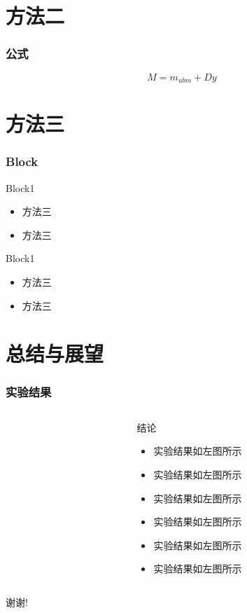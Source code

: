 \documentclass[8pt]{beamer}	%
\begin{document}

\section{方法二}

\begin{frame}
\frametitle{公式}
$$M=m_{ubm}+Dy$$
\end{frame}


\section{方法三}

\begin{frame}
\frametitle{Block}
\begin{block}{Block1}
	\begin{itemize}
		\item 方法三
        \item 方法三
	\end{itemize}
\end{block}
\pause
\begin{block}{Block1}
	\begin{itemize}
		\item 方法三
        \item 方法三
	\end{itemize}
\end{block}
\end{frame}


\section{总结与展望}

\begin{frame}
\frametitle{实验结果}
\begin{columns}
	\begin{column}{0.30\textwidth}
	\end{column}
	\begin{column}{0.50\textwidth}
		\begin{block}{结论}
			\begin{itemize}
			\item 实验结果如左图所示
			\item 实验结果如左图所示
			\item 实验结果如左图所示
			\item 实验结果如左图所示
			\item 实验结果如左图所示
			\item 实验结果如左图所示
			\end{itemize}
		\end{block}
	\end{column}
\end{columns}
\end{frame}




\begin{frame}
\centerline{\Huge 谢谢!}
\end{frame}
\end{document}

